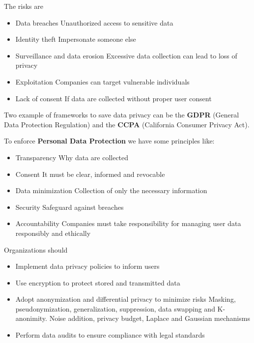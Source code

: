 The risks are 
\begin{itemize}
    \item Data breaches \ra Unauthorized access to sensitive data
    \item Identity theft \ra Impersonate someone else
    \item Surveillance and data erosion \ra Excessive data collection can lead to loss of privacy
    \item Exploitation \ra Companies can target vulnerable individuals 
    \item Lack of consent \ra If data are collected without proper user consent
\end{itemize}

Two example of frameworks to save data privacy can be the \textbf{GDPR} (General Data Protection Regulation) and the \textbf{CCPA} (California Consumer Privacy Act).

\vspace{10pt}

To enforce \textbf{Personal Data Protection} we have some principles like:
\begin{itemize}
    \item Transparency \ra Why data are collected
    \item Consent \ra It must be clear, informed and revocable
    \item Data minimization \ra Collection of only the necessary information
    \item Security \ra Safeguard against breaches
    \item Accountability \ra Companies must take responsibility for managing user data responsibly and ethically
\end{itemize}

Organizations should

\begin{itemize}
    \item Implement data privacy policies to inform users
    \item Use encryption to protect stored and transmitted data
    \item Adopt anonymization and differential privacy to minimize risks \ra Masking, pseudonymization, generalization, suppression, data swapping and K-anonimity. Noise addition, privacy budget, Laplace and Gaussian mechanisms
    \item Perform data audits to ensure compliance with legal standards
\end{itemize}

